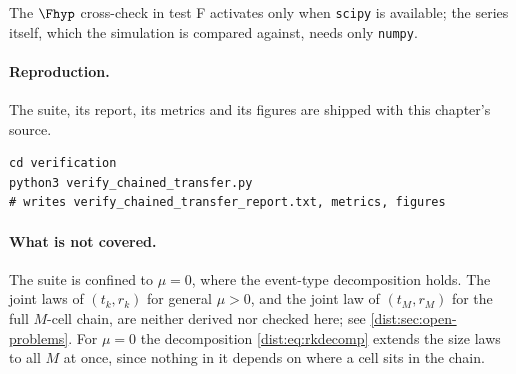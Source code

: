 The $\Fhyp$ cross-check in test F activates only when \texttt{scipy} is
available; the series itself, which the simulation is compared against, needs
only \texttt{numpy}.

\paragraph{Reproduction.} The suite, its report, its metrics and its figures
are shipped with this chapter's source.
\begin{verbatim}
cd verification
python3 verify_chained_transfer.py
# writes verify_chained_transfer_report.txt, metrics, figures
\end{verbatim}

\paragraph{What is not covered.} The suite is confined to $\mu=0$, where the
event-type decomposition holds. The joint laws of $(t_k,r_k)$ for general
$\mu>0$, and the joint law of $(t_M,r_M)$ for the full $M$-cell chain, are
neither derived nor checked here; see \cref{dist:sec:open-problems}. For
$\mu=0$ the decomposition \cref{dist:eq:rkdecomp} extends the size laws to
all $M$ at once, since nothing in it depends on where a cell sits in the
chain.
